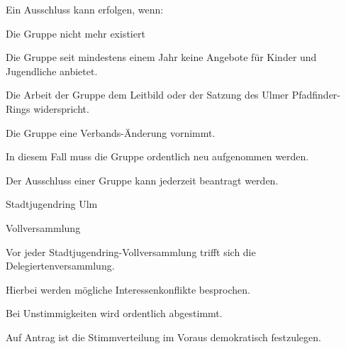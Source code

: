 \begin{legal}
\begin{legal}
                \begin{legal}
                    \item Ein Ausschluss kann erfolgen, wenn:
                        \begin{legal}
                            \item Die Gruppe nicht mehr existiert
                            \item Die Gruppe seit mindestens einem Jahr keine Angebote für Kinder 
                                  und Jugendliche anbietet.
                            \item Die Arbeit der Gruppe dem Leitbild oder der Satzung des Ulmer 
                                  Pfadfinder-Rings widerspricht.
                            \item Die Gruppe eine Verbands-Änderung vornimmt.
                                \begin{legal}
                                    \item In diesem Fall muss die Gruppe ordentlich neu aufgenommen 
                                          werden.
                                \end{legal}
                        \end{legal}
                    \item Der Ausschluss einer Gruppe kann jederzeit beantragt werden.
                \end{legal}
        \end{legal}
    \item Stadtjugendring Ulm
        \begin{legal}
            \item Vollversammlung
                \begin{legal}
                    \item Vor jeder Stadtjugendring-Vollversammlung trifft sich die 
                          Delegiertenversammlung.
                    \item Hierbei werden mögliche Interessenkonflikte besprochen.
                        \begin{legal}
                            \item Bei Unstimmigkeiten wird ordentlich abgestimmt.
                        \end{legal}
                    \item Auf Antrag ist die Stimmverteilung im Voraus demokratisch festzulegen.

\end{legal}
\end{legal}
\end{legal}
